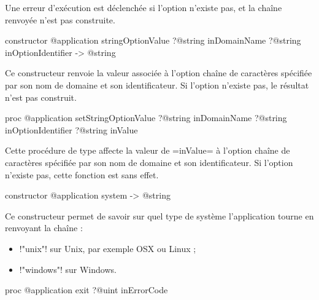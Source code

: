 Une erreur d'exécution est déclenchée si l'option n'existe pas, et la chaîne renvoyée n'est pas construite.





\begin{galgasbox}
constructor @application stringOptionValue
    ?@string inDomainName
    ?@string inOptionIdentifier -> @string
\end{galgasbox}

Ce constructeur renvoie la valeur associée à l'option chaîne de caractères spécifiée par son nom de domaine et son identificateur. Si l'option n'existe pas, le résultat n'est pas construit.






\begin{galgasbox}
proc @application setStringOptionValue
    ?@string inDomainName
    ?@string inOptionIdentifier
    ?@string inValue
\end{galgasbox}

Cette procédure de type affecte la valeur de \ggs=inValue= à l'option chaîne de caractères spécifiée par son nom de domaine et son identificateur. Si l'option n'existe pas, cette fonction est sans effet.












\begin{galgasbox}
constructor @application system -> @string
\end{galgasbox}

Ce constructeur permet de savoir sur quel type de système l'application tourne en renvoyant la chaîne :
\begin{itemize}
  \item \ggs!"unix"! sur Unix, par exemple OSX ou Linux ;
  \item \ggs!"windows"! sur Windows.
\end{itemize}






\begin{galgasbox}
proc @application exit ?@uint inErrorCode
\end{galgasbox}

